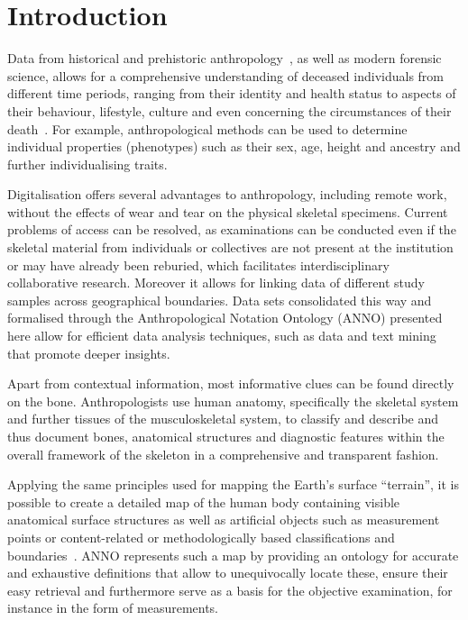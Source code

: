 \documentclass[sw]{iosart2x}
\begin{document}


\section{Introduction}\label{sec:introduction}

Data from historical and prehistoric anthropology~\citep{prehistoricanthropology}, as well as modern forensic science, allows for a comprehensive understanding of deceased individuals from different time periods, ranging from their identity and health status to aspects of their behaviour, lifestyle, culture and even concerning the circumstances of their death~\citep{spurensuche}.
For example, anthropological methods can be used to determine individual properties (phenotypes) such as their sex, age, height and ancestry and further individualising traits.

Digitalisation offers several advantages to anthropology, including remote work, without the effects of wear and tear on the physical skeletal specimens.
Current problems of access can be resolved, as examinations can be conducted even if the skeletal material from individuals or collectives are not present at the institution or may have already been reburied, which facilitates interdisciplinary collaborative research.
Moreover it allows for linking data of different study samples across geographical boundaries.
Data sets consolidated this way and formalised through the Anthropological Notation Ontology (ANNO) presented here allow for efficient data analysis techniques, such as data and text mining that promote deeper insights.

Apart from contextual information, most informative clues can be found directly on the bone.
Anthropologists use human anatomy, specifically the skeletal system and further tissues of the musculoskeletal system, to classify and describe and thus document bones, anatomical structures and diagnostic features within the overall framework of the skeleton in a comprehensive and transparent fashion.

Applying the same principles used for mapping the Earth’s surface \enquote{terrain}, it is possible to create a detailed map of the human body containing visible anatomical surface structures as well as artificial objects such as measurement points or content-related or methodologically based classifications and boundaries~\citep{topo}. ANNO represents such a map by providing an ontology for accurate and exhaustive definitions that allow to unequivocally locate these, ensure their easy retrieval and furthermore serve as a basis for the objective examination, for instance in the form of measurements.
\end{document}
